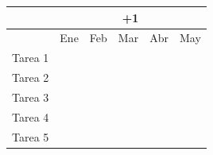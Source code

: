 \documentclass[12pt]{extarticle}
\numberwithin{equation}{section}
\newcommand{\BeginYear}{2025}
\newcommand{\EndYear}{\number\numexpr\BeginYear+1\relax }
\begin{document}
\begin{table}[h!]
\centering
\begin{tabular}{|c|ccccc|}
\hline
& 
\multicolumn{5}{c|}{\EndYear}
\\ \hline
& 
\multicolumn{1}{c|}{Ene}                      & 
\multicolumn{1}{c|}{Feb}                      & 
\multicolumn{1}{c|}{Mar}                      & 
\multicolumn{1}{c|}{Abr}                      & 
\multicolumn{1}{c|}{May}                      
\\ \hline
Tarea 1 & 
\multicolumn{1}{c|}{\cellcolor[HTML]{C0C0C0}} & %
\multicolumn{1}{c|}{\cellcolor[HTML]{C0C0C0}} & %
\multicolumn{1}{c|}{\cellcolor[HTML]{C0C0C0}} & %
\multicolumn{1}{c|}{}                         & %
\multicolumn{1}{c|}{}                           %
\\ \hline
Tarea 2 &    
\multicolumn{1}{c|}{}                         & %
\multicolumn{1}{c|}{\cellcolor[HTML]{C0C0C0}} & %
\multicolumn{1}{c|}{}                         & %
\multicolumn{1}{c|}{}                         & %
\multicolumn{1}{c|}{}                           %
\\ \hline
Tarea 3 &    
\multicolumn{1}{c|}{}                         & %
\multicolumn{1}{c|}{}                         & %
\multicolumn{1}{c|}{\cellcolor[HTML]{C0C0C0}} & %
\multicolumn{1}{c|}{\cellcolor[HTML]{C0C0C0}} & %
\multicolumn{1}{c|}{}                           %
\\ \hline
Tarea 4 &    
\multicolumn{1}{c|}{}                         & %
\multicolumn{1}{c|}{}                         & %
\multicolumn{1}{c|}{}                         & %
\multicolumn{1}{c|}{\cellcolor[HTML]{C0C0C0}} & %
\multicolumn{1}{c|}{\cellcolor[HTML]{C0C0C0}}  %
\\ \hline
Tarea 5 &    
\multicolumn{1}{c|}{}                         & %
\multicolumn{1}{c|}{}                         & %
\multicolumn{1}{c|}{}                         & %
\multicolumn{1}{c|}{}                         & %
\multicolumn{1}{c|}{\cellcolor[HTML]{C0C0C0}}  %
\\ \hline
\end{tabular}
\end{table}

\newpage


\end{document}

